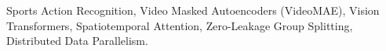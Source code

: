\documentclass[conference]{IEEEtran}
\begin{document}
\begin{IEEEkeywords}
Sports Action Recognition, Video Masked Autoencoders (VideoMAE), Vision Transformers, Spatiotemporal Attention, Zero-Leakage Group Splitting, Distributed Data Parallelism.
\end{IEEEkeywords}











\end{document}
